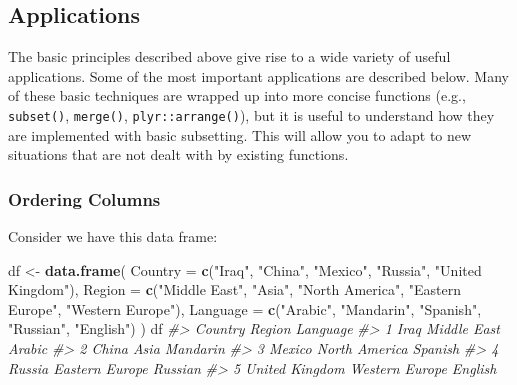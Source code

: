 \documentclass[]{book}
\newenvironment{Shaded}{\begin{snugshade}}{\end{snugshade}}
\newcommand{\CommentTok}[1]{\textcolor[rgb]{0.56,0.35,0.01}{\textit{#1}}}
\newcommand{\DataTypeTok}[1]{\textcolor[rgb]{0.13,0.29,0.53}{#1}}
\newcommand{\KeywordTok}[1]{\textcolor[rgb]{0.13,0.29,0.53}{\textbf{#1}}}
\newcommand{\NormalTok}[1]{#1}
\newcommand{\StringTok}[1]{\textcolor[rgb]{0.31,0.60,0.02}{#1}}
\begin{document}
\hypertarget{applications}{%
\subsection{Applications}\label{applications}}

The basic principles described above give rise to a wide variety of useful applications. Some of the most important applications are described below. Many of these basic techniques are wrapped up into more concise functions (e.g., \texttt{subset()}, \texttt{merge()}, \texttt{plyr::arrange()}), but it is useful to understand how they are implemented with basic subsetting. This will allow you to adapt to new situations that are not dealt with by existing functions.

\hypertarget{ordering-columns}{%
\subsubsection*{Ordering Columns}\label{ordering-columns}}

Consider we have this data frame:

\begin{Shaded}
\begin{Highlighting}[]
\NormalTok{df <-}\StringTok{ }\KeywordTok{data.frame}\NormalTok{(}
  \DataTypeTok{Country =} \KeywordTok{c}\NormalTok{(}\StringTok{"Iraq"}\NormalTok{, }\StringTok{"China"}\NormalTok{, }\StringTok{"Mexico"}\NormalTok{, }\StringTok{"Russia"}\NormalTok{, }\StringTok{"United Kingdom"}\NormalTok{),}
  \DataTypeTok{Region =} \KeywordTok{c}\NormalTok{(}\StringTok{"Middle East"}\NormalTok{, }\StringTok{"Asia"}\NormalTok{, }\StringTok{"North America"}\NormalTok{, }\StringTok{"Eastern Europe"}\NormalTok{, }\StringTok{"Western Europe"}\NormalTok{),}
  \DataTypeTok{Language =} \KeywordTok{c}\NormalTok{(}\StringTok{"Arabic"}\NormalTok{, }\StringTok{"Mandarin"}\NormalTok{, }\StringTok{"Spanish"}\NormalTok{, }\StringTok{"Russian"}\NormalTok{, }\StringTok{"English"}\NormalTok{)}
\NormalTok{)}
\NormalTok{df}
\CommentTok{#>          Country         Region Language}
\CommentTok{#> 1           Iraq    Middle East   Arabic}
\CommentTok{#> 2          China           Asia Mandarin}
\CommentTok{#> 3         Mexico  North America  Spanish}
\CommentTok{#> 4         Russia Eastern Europe  Russian}
\CommentTok{#> 5 United Kingdom Western Europe  English}
\end{Highlighting}
\end{Shaded}
\end{document}
